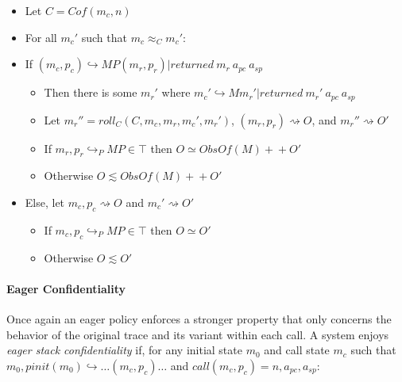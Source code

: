 \documentclass{article}
\begin{document}
      \begin{itemize}
        \item Let \(C = \mathit{Cof}(m_c,n)\)
        \item For all \(m_c'\) such that \(m_c \approx_C m_c'\):
        \item If \((m_c,p_c) \hookrightarrow MP (m_r,p_r) | \mathit{returned}\ m_r\ a_{pc}\ a_{sp}\)
          \begin{itemize}
            \item Then there is some \(m_r'\) where
              \(m_c' \hookrightarrow M m_r' | \mathit{returned}\ m_r'\ a_{pc}\ a_{sp}\)
            \item Let \(m_r'' = \mathit{roll}_C(C,m_c,m_r,m_c',m_r')\),
              \((m_r,p_r) \rightsquigarrow O\), and \(m_r'' \rightsquigarrow O'\)
            \item If \(m_r,p_r \hookrightarrow_P MP \in \top\) then \(O \simeq \mathit{ObsOf}(M) +\!\!\!+ O'\)
            \item Otherwise \(O \lesssim \mathit{ObsOf}(M) +\!\!\!+ O'\)
          \end{itemize}
        \item Else, let \(m_c,p_c \rightsquigarrow O\) and \(m_c' \rightsquigarrow O'\)
          \begin{itemize}
            \item If \(m_c,p_c \hookrightarrow_P MP \in \top\) then \(O \simeq O'\)
            \item Otherwise \(O \lesssim O'\)
          \end{itemize}
      \end{itemize}

    \paragraph{Eager Confidentiality}

      Once again an eager policy enforces a stronger property that only concerns the behavior of
      the original trace and its variant within each call. A system enjoys {\it eager stack
      confidentiality} if, for any initial state \(m_0\) and call state \(m_c\) such that
      \(m_0,\mathit{pinit}(m_0) \hookrightarrow \dots (m_c,p_c) \dots\) and
      \(\mathit{call}(m_c,p_c) = n, a_{pc}, a_{sp}\):
\end{document}
